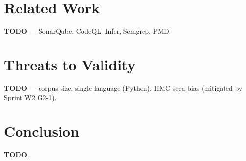\documentclass[acmsmall, screen]{acmart}
\begin{document}
\section{Related Work}
\textbf{TODO} — SonarQube, CodeQL, Infer, Semgrep, PMD.

\section{Threats to Validity}
\label{sec:tv}

\textbf{TODO} — corpus size, single-language (Python), HMC seed bias
(mitigated by Sprint W2 G2-1).

\section{Conclusion}
\textbf{TODO}.



\end{document}
